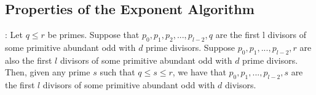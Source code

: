 \documentclass[../paper.tex]{subfiles}
\begin{document}
\subsection{Properties of the Exponent Algorithm}

\begin{theorem}[Property 1]

\end{theorem}

\begin{conj}:
Let $q \leq r$ be primes. Suppose that $p_0, p_1, p_2, ..., 
p_{l-2}, q$ are the first l divisors of some primitive abundant
odd with $d$ prime divisors. Suppose $p_0, p_1, ..., p_{l-2},r$ 
are also the first $l$ divisors of some primitive abundant odd
with $d$ prime divisors. Then, given any prime $s$ such that $q \leq s 
\leq r$, we have that $p_0, p_1,..., p_{l-2}, s$ are the first $l$
divisors of some primitive abundant odd with $d$ divisors.
\end{conj}
\end{document}
